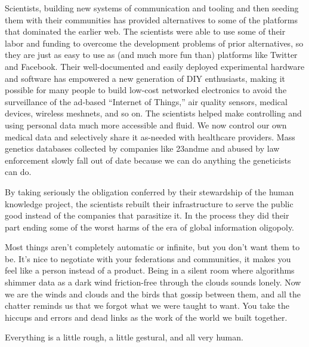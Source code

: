 Scientists, building new systems of communication and tooling and then
seeding them with their communities has provided alternatives to some of
the platforms that dominated the earlier web. The scientists were able
to use some of their labor and funding to overcome the development
problems of prior alternatives, so they are just as easy to use as (and
much more fun than) platforms like Twitter and Facebook. Their
well-documented and easily deployed experimental hardware and software
has empowered a new generation of DIY enthusiasts, making it possible
for many people to build low-cost networked electronics to avoid the
surveillance of the ad-based ``Internet of Things,'' air quality
sensors, medical devices, wireless meshnets, and so on. The scientists
helped make controlling and using personal data much more accessible and
fluid. We now control our own medical data and selectively share it
as-needed with healthcare providers. Mass genetics databases collected
by companies like 23andme and abused by law enforcement slowly fall out
of date because we can do anything the geneticists can do.

By taking seriously the obligation conferred by their stewardship of the
human knowledge project, the scientists rebuilt their infrastructure to
serve the public good instead of the companies that parasitize it. In
the process they did their part ending some of the worst harms of the
era of global information oligopoly.

Most things aren't completely automatic or infinite, but you don't want
them to be. It's nice to negotiate with your federations and
communities, it makes you feel like a person instead of a product. Being
in a silent room where algorithms shimmer data as a dark wind
friction-free through the clouds sounds lonely. Now we are the winds and
clouds and the birds that gossip between them, and all the chatter
reminds us that we forgot what we were taught to want. You take the
hiccups and errors and dead links as the work of the world we built
together.

Everything is a little rough, a little gestural, and all very human.

\citep{d} 
